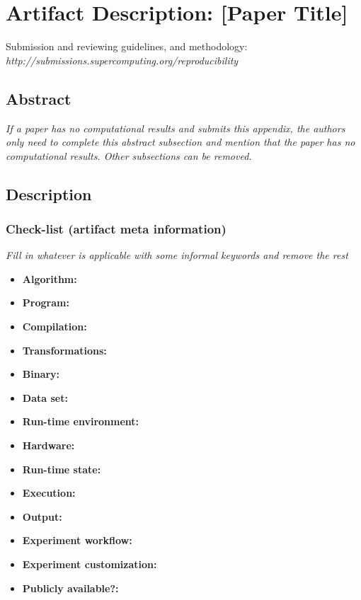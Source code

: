 \section{Artifact Description: [Paper Title]}

Submission and reviewing guidelines, and methodology: \\
{\small\em http://submissions.supercomputing.org/reproducibility}

\subsection{Abstract}

{\em If a paper has no computational results and submits this appendix, the authors only need to complete this abstract subsection and mention that the paper has no computational results.  Other subsections can be removed.}

\subsection{Description}

\subsubsection{Check-list (artifact meta information)}

{\em Fill in whatever is applicable with some informal keywords and remove the rest}

{\small
\begin{itemize}
  \item {\bf Algorithm: }
  \item {\bf Program: }
  \item {\bf Compilation: }
  \item {\bf Transformations: }
  \item {\bf Binary: }
  \item {\bf Data set: }
  \item {\bf Run-time environment: }
  \item {\bf Hardware: }
  \item {\bf Run-time state: }
  \item {\bf Execution: }
  \item {\bf Output: }
  \item {\bf Experiment workflow: }
  \item {\bf Experiment customization: }
  \item {\bf Publicly available?: }
\end{itemize}
}

